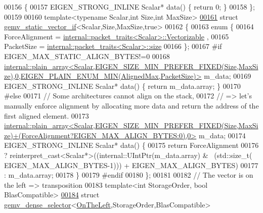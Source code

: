 \begin{DoxyCode}
00156 \{
00157   EIGEN\_STRONG\_INLINE Scalar* data() \{ \textcolor{keywordflow}{return} 0; \}
00158 \};
00159 
00160 \textcolor{keyword}{template}<\textcolor{keyword}{typename} Scalar,\textcolor{keywordtype}{int} Size,\textcolor{keywordtype}{int} MaxSize>
\hyperlink{struct_eigen_1_1internal_1_1gemv__static__vector__if_3_01_scalar_00_01_size_00_01_max_size_00_01true_01_4}{00161} \textcolor{keyword}{struct }\hyperlink{struct_eigen_1_1internal_1_1gemv__static__vector__if}{gemv\_static\_vector\_if}<Scalar,Size,MaxSize,true>
00162 \{
00163   \textcolor{keyword}{enum} \{
00164     ForceAlignment  = \hyperlink{struct_eigen_1_1internal_1_1packet__traits}{internal::packet\_traits<Scalar>::Vectorizable}
      ,
00165     PacketSize      = \hyperlink{struct_eigen_1_1internal_1_1packet__traits}{internal::packet\_traits<Scalar>::size}
00166   \};
00167 \textcolor{preprocessor}{  #if EIGEN\_MAX\_STATIC\_ALIGN\_BYTES!=0}
00168   
      \hyperlink{struct_eigen_1_1internal_1_1plain__array}{
      internal::plain\_array<Scalar,EIGEN\_SIZE\_MIN\_PREFER\_FIXED(Size,MaxSize),0,EIGEN\_PLAIN\_ENUM\_MIN(AlignedMax,PacketSize)>}
       m\_data;
00169   EIGEN\_STRONG\_INLINE Scalar* data() \{ \textcolor{keywordflow}{return} m\_data.array; \}
00170 \textcolor{preprocessor}{  #else}
00171   \textcolor{comment}{// Some architectures cannot align on the stack,}
00172   \textcolor{comment}{// => let's manually enforce alignment by allocating more data and return the address of the first
       aligned element.}
00173   
      \hyperlink{struct_eigen_1_1internal_1_1plain__array}{
      internal::plain\_array<Scalar,EIGEN\_SIZE\_MIN\_PREFER\_FIXED(Size,MaxSize)+(ForceAlignment?EIGEN\_MAX\_ALIGN\_BYTES:0),0>}
       m\_data;
00174   EIGEN\_STRONG\_INLINE Scalar* data() \{
00175     \textcolor{keywordflow}{return} ForceAlignment
00176             ? \textcolor{keyword}{reinterpret\_cast<}Scalar*\textcolor{keyword}{>}((internal::UIntPtr(m\_data.array) & ~(std::size\_t(
      EIGEN\_MAX\_ALIGN\_BYTES-1))) + EIGEN\_MAX\_ALIGN\_BYTES)
00177             : m\_data.array;
00178   \}
00179 \textcolor{preprocessor}{  #endif}
00180 \};
00181 
00182 \textcolor{comment}{// The vector is on the left => transposition}
00183 \textcolor{keyword}{template}<\textcolor{keywordtype}{int} StorageOrder, \textcolor{keywordtype}{bool} BlasCompatible>
\hyperlink{struct_eigen_1_1internal_1_1gemv__dense__selector_3_01_on_the_left_00_01_storage_order_00_01_blas_compatible_01_4}{00184} \textcolor{keyword}{struct }\hyperlink{struct_eigen_1_1internal_1_1gemv__dense__selector}{gemv\_dense\_selector}<\hyperlink{group__enums_ggac22de43beeac7a78b384f99bed5cee0ba129609b3bdf23b071f5f86cf2f995ec4}{OnTheLeft},StorageOrder,BlasCompatible>

\end{DoxyCode}
